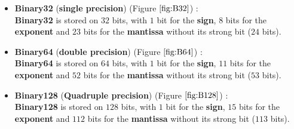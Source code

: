 \begin{itemize}
    \item \textbf{Binary32} (\textbf{single precision}) (Figure $\ref{fig:B32}$) :\\ 
    \textbf{Binary32} is stored on $32$ bits, with $1$ bit for the \textbf{sign}, $8$ bits for the \textbf{exponent} and $23$ bits for the \textbf{mantissa} without its strong bit ($24$ bits). 
    
    \item \textbf{Binary64} (\textbf{double precision}) (Figure $\ref{fig:B64}$) :\\
    \textbf{Binary64} is stored on $64$ bits, with $1$ bit for the \textbf{sign}, $11$ bits for the \textbf{exponent} and $52$ bits for the \textbf{mantissa} without its strong bit ($53$ bits). 
    
    
    \item \textbf{Binary128} (\textbf{Quadruple precision}) (Figure $\ref{fig:B128}$) :\\
    \textbf{Binary128} is stored on $128$ bits, with $1$ bit for the \textbf{sign}, $15$ bits for the \textbf{exponent} and $112$ bits for the \textbf{mantissa} without its strong bit ($113$ bits). 
\end{itemize}

